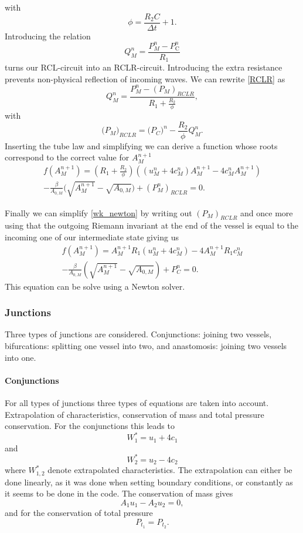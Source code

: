\documentclass[a4paper, oneside]{discothesis}
\begin{document}
with 
\begin{equation}
	\phi = \frac{R_{2}C}{\Delta t} + 1. 
\end{equation}
Introducing the relation
\begin{equation}
	Q_M^n={\frac{P_M^n-P_{\mathrm{C}}^{n}}{R_{1}}} \label{RCLR}
\end{equation}
turns our RCL-circuit into an RCLR-circuit.
Introducing the extra resistance prevents non-physical reflection of incoming waves.
We can rewrite \ref{RCLR} as 
\begin{equation}
	Q_M^n={\frac{P_M^n-(P_{M})_{R C L R}}{R_{1}+{\frac{R_{2}}{\phi}}}}, 
\end{equation}
with 
\begin{equation}
	\bigl(P_{M}\bigr)_{RCLR}=\bigl(P_{C}\bigr)^{n}-{\frac{R_{2}}{\phi}}Q_M^n.
\end{equation}
Inserting the tube law and simplifying we can derive a function whose roots correspond to the correct value for $A_M^{n+1}$
\begin{multline}
	f(A_M^{n+1}) = \left(R_{1}+{\frac{R_{2}}{\phi}}\right)\left( \left(u_{M}^n+4c_{M}^n \right)A_M^{n+1}-4c_M^nA_M^{n+1} \right) \\
	-{\frac{\beta}{A_{0,M}}}\Big(\sqrt{A_M^{n+1}}-\sqrt{A_{0,M}}\Big)+(P_{M}^n)_{R C L R} =0. \label{wk_newton}
\end{multline}

Finally we can simplify \ref{wk_newton} by writing out $(P_{M})_{RCLR}$ and once more using that the outgoing Riemann invariant at the end of the vessel is equal to the incoming one of our intermediate state giving us
\begin{multline}
	f\left(A_M^{n+1}\right) = A_M^{n+1} R_1\left(u_M^n+4 c_M^n\right)-4 A_M^{n+1} R_1 c_M^n\\
	-\frac{\beta}{A_{0,M}}\left(\sqrt{A_M^{n+1}}-\sqrt{A_{0,M}}\right)+P_C^n = 0. \label{wk_eq3}
\end{multline}
This equation can be solve using a Newton solver.

\subsubsection{Junctions} \label{sssec:junctions}
Three types of junctions are considered.
Conjunctions: joining two vessels, bifurcations: splitting one vessel into two, and anastomosis: joining two vessels into one.
\paragraph{Conjunctions} \label{par:conjunctions}
For all types of junctions three types of equations are taken into account. 
Extrapolation of characteristics, conservation of mass and total pressure conservation.
For the conjunctions this leads to
$$
W_1^*=u_1+4 c_1
$$
and 
$$
W_2^*=u_2-4 c_2
$$
where $W_{1,2}^*$ denote extrapolated characteristics. 
The extrapolation can either be done linearly, as it was done when setting boundary conditions, or constantly as it seems to be done in the code. 
The conservation of mass gives
$$A_1 u_1-A_2 u_2=0,$$
and for the conservation of total pressure
$$P_{t_1}=P_{t_2}.$$
\end{document}
